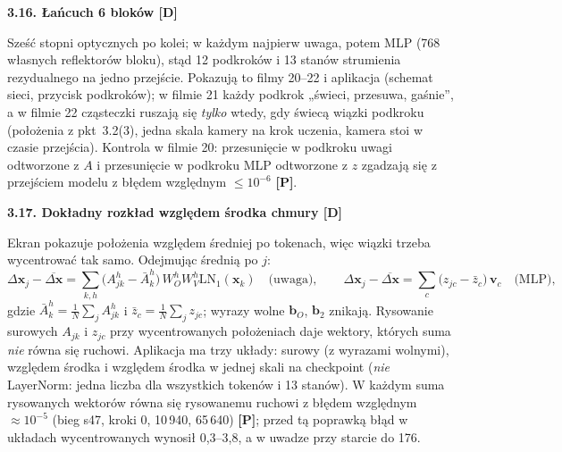 \documentclass[a4paper,11pt]{article}
\newcommand{\stD}{\textcolor{dok}{\textsf{\textbf{[D]}}}}
\newcommand{\stP}{\textcolor{pom}{\textsf{\textbf{[P]}}}}
\newcommand{\LN}{\mathrm{LN}}
\newcounter{pn}
\newcommand{\elem}[1]{\par\medskip\noindent\textbf{#1}\par\nopagebreak}
\begin{document}
\elem{3.16. Łańcuch 6 bloków \stD}
Sześć stopni optycznych po kolei; w każdym najpierw uwaga, potem MLP (768 własnych reflektorów bloku), stąd 12 podkroków
i 13 stanów strumienia rezydualnego na jedno przejście. Pokazują to filmy 20--22 i aplikacja (schemat sieci, przycisk podkroków);
w filmie 21 każdy podkrok „świeci, przesuwa, gaśnie”, a w filmie 22 cząsteczki ruszają się \emph{tylko} wtedy, gdy świecą wiązki
podkroku (położenia z pkt~3.2(3), jedna skala kamery na krok uczenia, kamera stoi w czasie przejścia). Kontrola w filmie 20: przesunięcie
w podkroku uwagi odtworzone z $A$ i przesunięcie w podkroku MLP odtworzone z $z$ zgadzają się z przejściem modelu z błędem względnym
$\le10^{-6}$ \stP.

\elem{3.17. Dokładny rozkład względem środka chmury \stD}
Ekran pokazuje położenia względem średniej po tokenach, więc wiązki trzeba wycentrować tak samo. Odejmując średnią po $j$:
\begin{equation}
\Delta\bm x_j-\overline{\Delta\bm x}=\sum_{k,h}\big(A^{h}_{jk}-\bar A^{h}_{k}\big)\,W_O^{h}W_V^{h}\LN_1(\bm x_k)
\quad\text{(uwaga)},\qquad
\Delta\bm x_j-\overline{\Delta\bm x}=\sum_{c}\big(z_{jc}-\bar z_{c}\big)\,\bm v_c\quad\text{(MLP)},
\end{equation}
gdzie $\bar A^{h}_{k}=\frac1N\sum_j A^{h}_{jk}$ i $\bar z_c=\frac1N\sum_j z_{jc}$; wyrazy wolne $\bm b_O$, $\bm b_2$ znikają.
Rysowanie surowych $A_{jk}$ i $z_{jc}$ przy wycentrowanych położeniach daje wektory, których suma \emph{nie} równa się ruchowi.
Aplikacja ma trzy układy: surowy (z wyrazami wolnymi), względem środka i względem środka w jednej skali na checkpoint
(\emph{nie} LayerNorm: jedna liczba dla wszystkich tokenów i 13 stanów). W każdym suma rysowanych wektorów równa się rysowanemu
ruchowi z błędem względnym $\approx10^{-5}$ (bieg s47, kroki 0, 10\,940, 65\,640) \stP; przed tą poprawką błąd w układach
wycentrowanych wynosił 0,3--3,8, a w uwadze przy starcie do 176.
\end{document}
